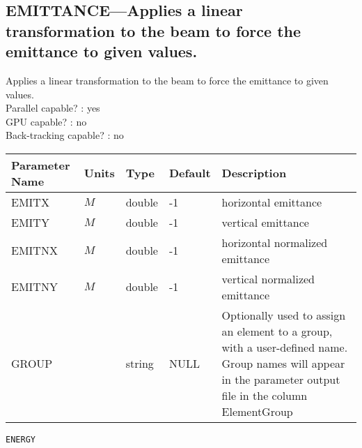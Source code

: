 \subsection{EMITTANCE---Applies a linear transformation to the beam to force the emittance to given values.}
Applies a linear transformation to the beam to force the emittance to given values.
\\
Parallel capable? : yes\\
GPU capable? : no\\
Back-tracking capable? : no\\
\begin{tabular}{|l|l|l|l|p{\descwidth}|} \hline
Parameter Name & Units & Type & Default & Description \\ \hline 
EMITX & $M$ & double &   -1 & horizontal emittance  \\ \hline 
EMITY & $M$ & double &   -1 & vertical emittance  \\ \hline 
EMITNX & $M$ & double &   -1 & horizontal normalized emittance  \\ \hline 
EMITNY & $M$ & double &   -1 & vertical normalized emittance  \\ \hline 
GROUP &  & string & NULL & Optionally used to assign an element to a group, with a user-defined name.  Group names will appear in the parameter output file in the column ElementGroup  \\ \hline 
\end{tabular}

\vspace*{0.5in}

\newpage
\begin{center}{\Large\verb|ENERGY|}\end{center}
